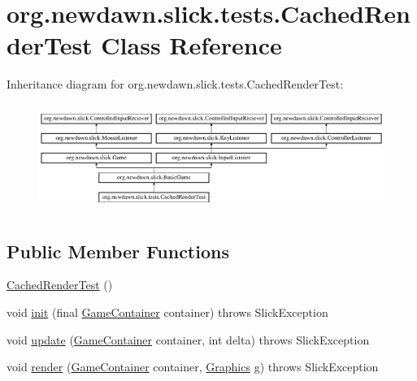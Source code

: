 \hypertarget{classorg_1_1newdawn_1_1slick_1_1tests_1_1_cached_render_test}{}\section{org.\+newdawn.\+slick.\+tests.\+Cached\+Render\+Test Class Reference}
\label{classorg_1_1newdawn_1_1slick_1_1tests_1_1_cached_render_test}
Inheritance diagram for org.\+newdawn.\+slick.\+tests.\+Cached\+Render\+Test\+:\begin{figure}[H]
\begin{center}
\leavevmode
\includegraphics[height=3.508772cm]{classorg_1_1newdawn_1_1slick_1_1tests_1_1_cached_render_test}
\end{center}
\end{figure}
\subsection*{Public Member Functions}
\begin{DoxyCompactItemize}
\item 
\mbox{\hyperlink{classorg_1_1newdawn_1_1slick_1_1tests_1_1_cached_render_test_aec210751ba11df5b8061d362723f21f0}{Cached\+Render\+Test}} ()
\item 
void \mbox{\hyperlink{classorg_1_1newdawn_1_1slick_1_1tests_1_1_cached_render_test_a03ef696801a0f0b42eb3e68cb162b154}{init}} (final \mbox{\hyperlink{classorg_1_1newdawn_1_1slick_1_1_game_container}{Game\+Container}} container)  throws Slick\+Exception 
\item 
void \mbox{\hyperlink{classorg_1_1newdawn_1_1slick_1_1tests_1_1_cached_render_test_ad267cdebf5cc325fb32c997d876a9eb1}{update}} (\mbox{\hyperlink{classorg_1_1newdawn_1_1slick_1_1_game_container}{Game\+Container}} container, int delta)  throws Slick\+Exception 
\item 
void \mbox{\hyperlink{classorg_1_1newdawn_1_1slick_1_1tests_1_1_cached_render_test_a9314cb710b62c992d698e1f15337f3d7}{render}} (\mbox{\hyperlink{classorg_1_1newdawn_1_1slick_1_1_game_container}{Game\+Container}} container, \mbox{\hyperlink{classorg_1_1newdawn_1_1slick_1_1_graphics}{Graphics}} g)  throws Slick\+Exception 
\end{DoxyCompactItemize}
